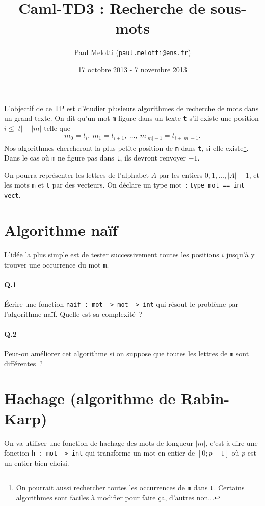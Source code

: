 \documentclass[10pt,a4paper]{article}
\begin{document}
\title{Caml-TD3 : Recherche de sous-mots}
\date{17 octobre 2013 - 7 novembre 2013}
\author{Paul Melotti (\texttt{paul.melotti@ens.fr})}
\maketitle{}

L'objectif de ce TP est d'étudier plusieurs algorithmes de recherche de 
mots dans un grand texte. On dit qu'un mot \texttt{m} figure dans un texte 
\texttt{t} s'il existe une position $i\leq |t|-|m|$ telle que
\[m_0 = t_i, \ m_1 = t_{i+1},\  \dots, \ m_{|m|-1} = t_{i+|m|-1}. \]
Nos algorithmes chercheront la plus petite position de \texttt{m} dans
\texttt{t}, si elle existe\footnote{On pourrait aussi rechercher toutes les 
occurrences de \texttt{m} dans \texttt{t}. Certains algorithmes sont faciles à 
modifier pour faire ça, d'autres non...}. Dans le cas où \texttt{m} ne figure pas 
dans \texttt{t}, ils devront renvoyer $-1$.

On pourra représenter les lettres de l'alphabet $A$ par les entiers 
$0, 1, \dots, |A|-1$, et les mots \texttt{m} et \texttt{t} par des vecteurs. On 
déclare un type mot~: \texttt{type mot == int vect}.

\section{Algorithme naïf}
L'idée la plus simple est de tester successivement toutes les positions $i$ 
jusqu'à y trouver une occurrence du mot \texttt{m}.
\paragraph{Q.1} Écrire une fonction \texttt{naif : mot -> mot -> int} qui 
résout le problème par l'algorithme naïf. Quelle est sa complexité~?
\paragraph{Q.2} Peut-on améliorer cet algorithme si on suppose que toutes les
lettres de \texttt{m} sont différentes~?
\section{Hachage (algorithme de Rabin-Karp)}
On va utiliser une fonction de hachage des mots de longueur $|m|$, c'est-à-dire 
une fonction \texttt{h : mot -> int} qui transforme un mot en entier de $[0;p-1]$ où 
$p$ est un entier bien choisi.
\end{document}

